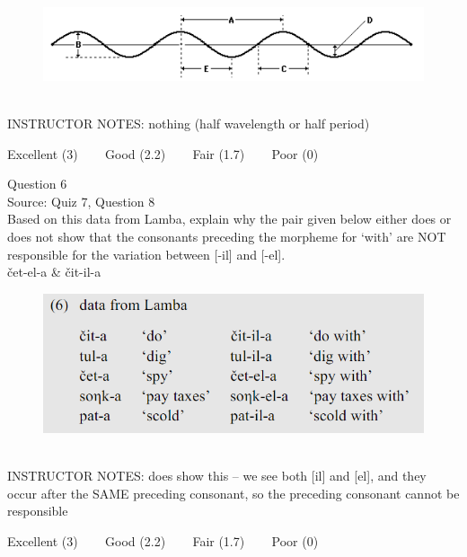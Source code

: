 \documentclass[12pt]{article}
\begin{document}
\begin{figure}[H]
\includegraphics{../images/sinusoid.png}
\end{figure}

~\\
INSTRUCTOR NOTES: nothing (half wavelength or half period)


\vfill
Excellent (3) ~~~ Good (2.2) ~~~ Fair (1.7) ~~~ Poor (0)
\newpage

{\large Question 6}\\

Source: Quiz 7, Question 8\\

Based on this data from Lamba, explain why the pair given below either does or does not show that the consonants preceding the morpheme for `with' are NOT responsible for the variation between [-il] and [-el].\\

čet-el-a \& čit-il-a

\begin{figure}[H]
\includegraphics{../images/peng119_lamba.png}
\end{figure}

~\\
INSTRUCTOR NOTES: does show this -- we see both [il] and [el], and they occur after the SAME preceding consonant, so the preceding consonant cannot be responsible


\vfill
Excellent (3) ~~~ Good (2.2) ~~~ Fair (1.7) ~~~ Poor (0)
\newpage

\begin{center}
\textbf{{\color{red}{\HUGE END OF EXAM}}}\\

\end{center}
\newpage
\end{document}
